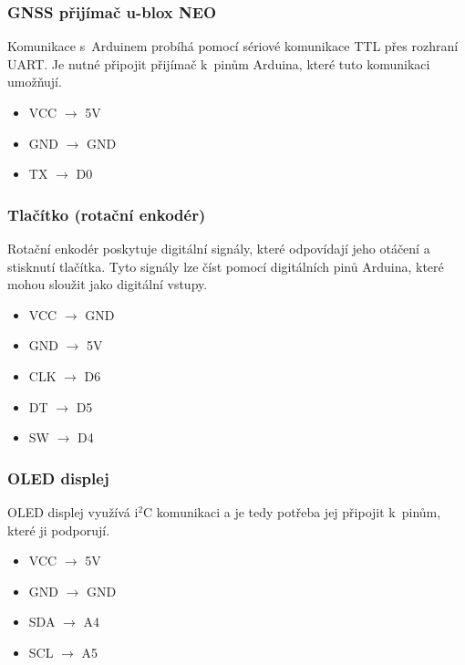 \subsubsection*{GNSS přijímač u-blox NEO}
Komunikace s~Arduinem probíhá pomocí sériové komunikace TTL přes rozhraní UART. Je nutné připojit přijímač k~pinům Arduina, které tuto komunikaci umožňují.
 \begin{itemize}
     \tiny
     \setlength{\itemsep}{0pt} 
     \item VCC $\rightarrow$ 5V 
     \item GND $\rightarrow$ GND
     \item TX  $\rightarrow$ D0
 \end{itemize}

    
\subsubsection*{Tlačítko (rotační enkodér)}
Rotační enkodér poskytuje digitální signály, které odpovídají jeho otáčení a stisknutí tlačítka. Tyto signály lze číst pomocí digitálních pinů Arduina, které mohou sloužit jako digitální vstupy.
\begin{itemize}    
    \tiny
    \setlength{\itemsep}{0pt} 
    \item VCC $\rightarrow$ GND
    \item GND $\rightarrow$ 5V
    \item CLK $\rightarrow$ D6
    \item DT  $\rightarrow$ D5
    \item SW  $\rightarrow$ D4
\end{itemize}

\subsubsection*{OLED displej}
OLED displej využívá i\(^2\)C komunikaci a je tedy potřeba jej připojit k~pinům, které ji podporují.
\begin{itemize}
    \tiny
    \setlength{\itemsep}{0pt} 
    \item VCC $\rightarrow$ 5V 
    \item GND $\rightarrow$ GND
    \item SDA $\rightarrow$ A4
    \item SCL $\rightarrow$ A5 
\end{itemize}

